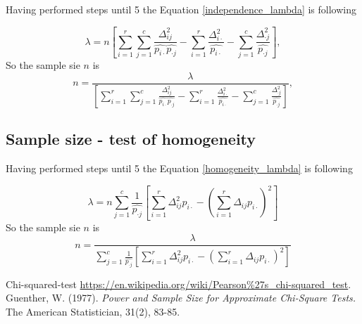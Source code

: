 \documentclass{article}
\begin{document}
Having performed steps until 5 the Equation \ref{independence_lambda} is following

\begin{equation}
    \lambda = n\left[\sum_{i=1}^{r}\sum_{j=1}^c \frac{\Delta_{ij}^2}{\widehat{p_{i\cdot}}\widehat{p_{\cdot j}}} - \sum_{i=1}^{r}\frac{\Delta_{i \cdot}^2}{\widehat{p_{i \cdot}}} - \sum_{j=1}^{c}\frac{\Delta_{\cdot j}^2}{\widehat{p_{\cdot j}}}\right],
\end{equation}
So the sample sie $n$ is
\begin{equation}
    n = \frac{\lambda}{\left[\sum_{i=1}^{r}\sum_{j=1}^c \frac{\Delta_{ij}^2}{\widehat{p_{i\cdot}}\widehat{p_{\cdot j}}} - \sum_{i=1}^{r}\frac{\Delta_{i \cdot}^2}{\widehat{p_{i \cdot}}} - \sum_{j=1}^{c}\frac{\Delta_{\cdot j}^2}{\widehat{p_{\cdot j}}}\right]},
\end{equation}

\subsection{Sample size - test of homogeneity}

Having performed steps until 5 the Equation \ref{homogeneity_lambda} is following

\begin{equation}
    \lambda = n\sum_{j=1}^{c}\frac{1}{\widehat{p_{\cdot j}}}\left[ \sum_{i=1}^{r} \Delta_{ij}^2 p_{i\cdot} -  \left(\sum_{i=1}^{r} \Delta_{ij} p_{i\cdot}\right)^2  \right]
\end{equation}
So the sample sie $n$ is
\begin{equation}
    n = \frac{\lambda}{\sum_{j=1}^{c}\frac{1}{\widehat{p_{\cdot j}}}\left[ \sum_{i=1}^{r} \Delta_{ij}^2 p_{i\cdot} -  \left(\sum_{i=1}^{r} \Delta_{ij} p_{i\cdot}\right)^2  \right]}
\end{equation}

\begin{thebibliography}{9}
    Chi-squared-test 
    \url{https://en.wikipedia.org/wiki/Pearson\%27s\_chi-squared\_test}.
    Guenther, W. (1977). 
    \textit{Power and Sample Size for Approximate Chi-Square Tests.} 
    The American Statistician, 31(2), 83-85.

\end{thebibliography}   
\end{document}
